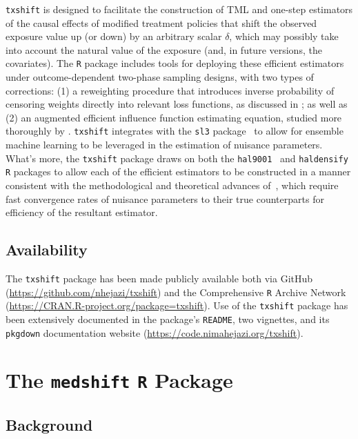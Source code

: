 \texttt{txshift} is designed to facilitate the construction of TML and one-step
estimators of the causal effects of modified treatment policies that shift the
observed exposure value up (or down) by an arbitrary scalar $\delta$, which may
possibly take into account the natural value of the exposure (and, in future
versions, the covariates). The \texttt{R} package includes tools for deploying
these efficient estimators under outcome-dependent two-phase sampling designs,
with two types of corrections: (1) a reweighting procedure that introduces
inverse probability of censoring weights directly into relevant loss functions,
as discussed in \citet{rose2011targeted2sd}; as well as (2) an augmented
efficient influence function estimating equation, studied more thoroughly by
\citet{hejazi2020efficient}. \texttt{txshift} integrates with the \texttt{sl3}
package~\citep{coyle2021sl3} to allow for ensemble machine learning to be
leveraged in the estimation of nuisance parameters. What's more, the
\texttt{txshift} package draws on both the
\texttt{hal9001}~\citep{coyle2021hal9001,hejazi2020hal9001} and
\texttt{haldensify}~\citep{hejazi2021haldensify} \texttt{R} packages to allow
each of the efficient estimators to be constructed in a manner consistent with
the methodological and theoretical advances of~\citet{hejazi2020efficient},
which require fast convergence rates of nuisance parameters to their true
counterparts for efficiency of the resultant estimator.

\subsection{Availability}

The \texttt{txshift} package has been made publicly available both via
GitHub (\url{https://github.com/nhejazi/txshift}) and the Comprehensive
\texttt{R} Archive Network (\url{https://CRAN.R-project.org/package=txshift}).
Use of the \texttt{txshift} package has been extensively documented in the
package's \texttt{README}, two vignettes, and its \texttt{pkgdown} documentation
website (\url{https://code.nimahejazi.org/txshift}).

\section{The \texttt{medshift} \texttt{R} Package}

\subsection{Background}

